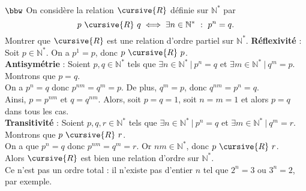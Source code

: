 \documentclass[11pt]{article}
\renewcommand*{\r}{\cursive{R}}
\begin{document}
\begin{exercice}{$\bbw$}{}
    On considère la relation $\r$ définie sur $\mathbb{N}^*$ par
    \begin{equation*}
        p ~ \r ~ q \iff \exists n \in \mathbb{N}^* ~ : ~ p^n = q.
    \end{equation*}
    Montrer que $\r$ est une relation d'ordre partiel sur $\mathbb{N}^*$.
    \tcblower
    \textbf{Réflexivité} : Soit $p \in \mathbb{N}^*$. On a $p^1=p$, donc $p ~ \r ~ p$.\\
    \textbf{Antisymétrie} : Soient $p,q\in\mathbb{N}^*$ tels que $\exists n \in \mathbb{N}^* ~ | ~ p^n = q$ et $\exists m \in \mathbb{N}^* ~ | ~ q^m = p$. Montrons que $p=q$.\\
    On a $p^n = q$ donc $p^{nm} = q^m = p$. De plus, $q^m = p$, donc $q^{nm} = p^n = q$.\\
    Ainsi, $p = p^{nm}$ et $q=q^{nm}$. Alors, soit $p = q = 1$, soit $n=m=1$ et alors $p=q$ dans tous les cas.\\[0.1cm]
    \textbf{Transitivité} : Soient $p,q,r \in \mathbb{N}^*$ tels que $\exists n \in \mathbb{N}^* ~ | ~ p^n = q$ et $\exists m \in \mathbb{N}^* ~ | ~ q^m = r$. Montrons que $p ~ \r ~ r$.\\
    On a que $p^{n} = q$ donc $p^{nm}=q^m=r$. Or $nm \in \mathbb{N}^*$, donc $p ~ \r ~ r$.\\[0.2cm]
    Alors $\r$ est bien une relation d'ordre sur $\mathbb{N}^*$.\\
    Ce n'est pas un ordre total : il n'existe pas d'entier $n$ tel que $2^n=3$ ou $3^n=2$, par exemple.
\end{exercice}

\pagebreak
\end{document}
